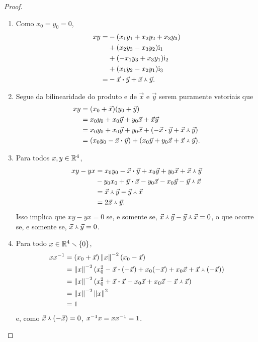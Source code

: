 \begin{proof}
\begin{enumerate}
	\item Como $x_0=y_0=0$,
	\begin{align*}
	xy =& -(x_1y_1 + x_2y_2 + x_3y_3) \\
			&+ (x_2y_3-x_3y_2) \mathrm{i}_1 \\
			&+ (-x_1y_3+x_3y_1) \mathrm{i}_2 \\
			&+ (x_1y_2-x_2y_1) \mathrm{i}_3 \\
		=& - {\vec{x}} \bm{\cdot} {\vec{y}} + {\vec{x}} \Yup {\vec{y}}.
	\end{align*}

	\item Segue da bilinearidade do produto e de $\vec{x}$ e $\vec{y}$ serem puramente vetoriais que
	\begin{align*}
	xy &= ({x}_0+\vec{x})({y}_0+\vec{y}) \\
		&= {x}_0{y}_0+{x}_0\vec{y}+{y}_0\vec{x}+\vec{x}\vec{y} \\
		&= {x}_0{y}_0+{x}_0\vec{y}+{y}_0\vec{x}+(-{\vec{x}} \bm{\cdot} {\vec{y}} + {\vec{x}} \Yup {\vec{y}}) \\
		&= ({x}_0{y}_0 - {\vec{x}} \bm{\cdot} {\vec{y}}) + ({x}_0\vec{y}+{y}_0\vec{x}+{\vec{x}} \Yup {\vec{y}}).
	\end{align*}

	\item Para todos $x,y \in \mathbb{R}^4$,
		\begin{align*}
		xy - yx &= {x}_0{y}_0 - {\vec{x}} \bm{\cdot} {\vec{y}}+{x}_0\vec{y}+{y}_0\vec{x}+{\vec{x}} \Yup {\vec{y}} \\
			&- {y}_0{x}_0 + {\vec{y}} \bm{\cdot} {\vec{x}}-{y}_0\vec{x}-{x}_0\vec{y}-{\vec{y}} \Yup {\vec{x}} \\
			&= {\vec{x}} \Yup {\vec{y}} - {\vec{y}} \Yup {\vec{x}} \\
			&= 2{\vec{x}} \Yup {\vec{y}}.
		\end{align*}
Isso implica que $xy-yx=0$ se, e somente se, ${\vec{x}} \Yup {\vec{y}} - {\vec{y}} \Yup {\vec{x}}=0$, o que ocorre se, e somente se, ${\vec{x}} \Yup {\vec{y}}=0$.%

	\item Para todo $x \in \mathbb{R}^4 \smallsetminus \{0\}$,
	\begin{align*}
	xx^{-1} &= ({x}_0+\vec{x})\left\Vert{x}\right\Vert^{-2}({x}_0-\vec{x}) \\
		&= \left\Vert{x}\right\Vert^{-2}({x}_0^2-{\vec{x}} \bm{\cdot} {(-\vec{x})}+{x}_0(-\vec{x})+{x}_0\vec{x}+{\vec{x}} \Yup {(-\vec{x})}) \\
		&= \left\Vert{x}\right\Vert^{-2}({x}_0^2+{\vec{x}} \bm{\cdot} {\vec{x}}-{x}_0\vec{x}+{x}_0\vec{x}-{\vec{x}} \Yup {\vec{x}}) \\
		&= \left\Vert{x}\right\Vert^{-2}\left\Vert{x}\right\Vert^2 \\
		&= 1
	\end{align*}
e, como ${\vec{x}} \Yup {(-\vec{x})} = 0$, $x^{-1} x = xx^{-1} = 1$.


\end{enumerate}
\end{proof}
